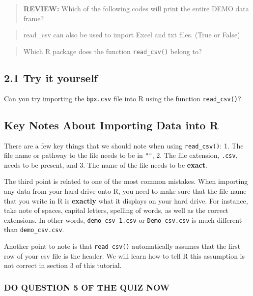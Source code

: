 \documentclass[
]{book}
\begin{document}
\begin{quote}
\textbf{REVIEW:} Which of the following codes will print the entire DEMO data frame?
\end{quote}

\begin{quote}
read\_csv can also be used to import Excel and txt files. (True or False)
\end{quote}

\begin{quote}
Which R package does the function \texttt{read\_csv()} belong to?
\end{quote}

\hypertarget{try-it-yourself-9}{%
\subsection{2.1 Try it yourself}\label{try-it-yourself-9}}

Can you try importing the \texttt{bpx.csv} file into R using the function \texttt{read\_csv()}?

\hypertarget{key-notes-about-importing-data-into-r}{%
\subsection{Key Notes About Importing Data into R}\label{key-notes-about-importing-data-into-r}}

There are a few key things that we should note when using \texttt{read\_csv()}:
1. The file name or pathway to the file needs to be in \texttt{""},
2. The file extension, \texttt{.csv}, needs to be present, and
3. The name of the file needs to be \textbf{exact}.

The third point is related to one of the most common mistakes. When importing any data from your hard drive onto R, you need to make sure that the file name that you write in R is \textbf{exactly} what it displays on your hard drive. For instance, take note of spaces, capital letters, spelling of words, as well as the correct extensions. In other words, \texttt{demo\_csv-1.csv} or \texttt{Demo\_csv.csv} is much different than \texttt{demo\_csv.csv}.

Another point to note is that \texttt{read\_csv()} automatically assumes that the first row of your csv file is the header. We will learn how to tell R this assumption is not correct in section 3 of this tutorial.

\hypertarget{do-question-5-of-the-quiz-now-1}{%
\subsubsection{DO QUESTION 5 OF THE QUIZ NOW}\label{do-question-5-of-the-quiz-now-1}}
\end{document}
